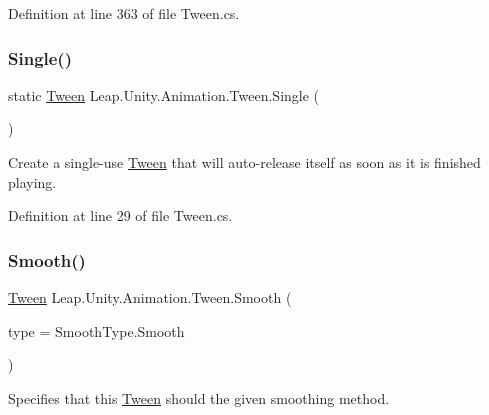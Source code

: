 Definition at line 363 of file Tween.\+cs.

\mbox{\label{struct_leap_1_1_unity_1_1_animation_1_1_tween_a7238365f2fb16c95082dc5d71b8f5139}} 
\subsubsection{\texorpdfstring{Single()}{Single()}}
{\footnotesize\ttfamily static \mbox{\hyperlink{struct_leap_1_1_unity_1_1_animation_1_1_tween}{Tween}} Leap.\+Unity.\+Animation.\+Tween.\+Single (\begin{DoxyParamCaption}{ }\end{DoxyParamCaption})\hspace{0.3cm}{\ttfamily [static]}}



Create a single-\/use \mbox{\hyperlink{struct_leap_1_1_unity_1_1_animation_1_1_tween}{Tween}} that will auto-\/release itself as soon as it is finished playing. 



Definition at line 29 of file Tween.\+cs.

\mbox{\label{struct_leap_1_1_unity_1_1_animation_1_1_tween_a7bb854a75ebd46b16addf1018768d6cd}} 
\subsubsection{\texorpdfstring{Smooth()}{Smooth()}\hspace{0.1cm}{\footnotesize\ttfamily [1/3]}}
{\footnotesize\ttfamily \mbox{\hyperlink{struct_leap_1_1_unity_1_1_animation_1_1_tween}{Tween}} Leap.\+Unity.\+Animation.\+Tween.\+Smooth (\begin{DoxyParamCaption}\item[{\mbox{\hyperlink{namespace_leap_1_1_unity_1_1_animation_a9667bc3fe4218574cb25efb892505c77}{Smooth\+Type}}}]{type = {\ttfamily SmoothType.Smooth} }\end{DoxyParamCaption})}



Specifies that this \mbox{\hyperlink{struct_leap_1_1_unity_1_1_animation_1_1_tween}{Tween}} should the given smoothing method. 



